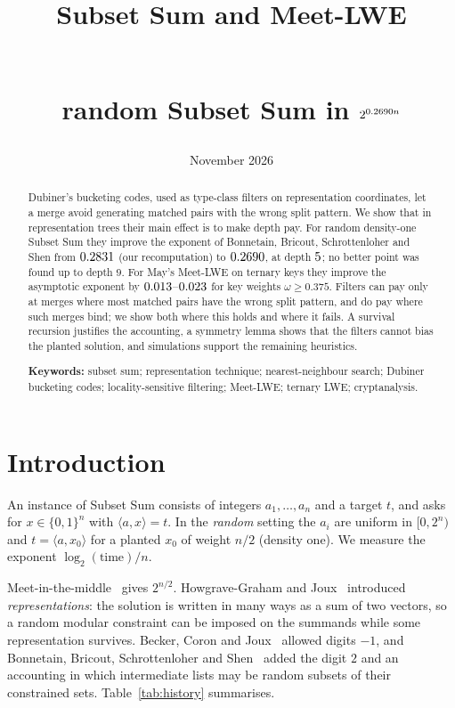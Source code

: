 \documentclass[11pt]{article}
\title{\titlehead:\\ Subset Sum and Meet-LWE}
\title{\titlehead:\\ random Subset Sum in \texorpdfstring{$2^{0.2690 n}$}{2\^{}(\Tbest n)}}
\date{November 2026}
\theoremstyle{definition}
\theoremstyle{remark}
\newif\ifincludemeetlwe \includemeetlwetrue  %
\begin{document}
\maketitle

\begin{abstract}
Dubiner's bucketing codes, used as type-class filters on representation coordinates, let a merge avoid generating
matched pairs with the wrong split pattern. We show that in representation trees their main effect is to make depth
pay. For random density-one Subset Sum they improve the exponent of Bonnetain, Bricout, Schrottenloher and Shen from
$0.2831$ (our recomputation) to $0.2690$, at depth $5$; no better point was found up to depth $9$.
\ifincludemeetlwe For May's Meet-LWE on ternary keys they improve the asymptotic exponent by $0.013$--$0.023$
for key weights $\omega\ge0.375$. \fi Filters can pay only at merges where most matched pairs have the wrong split
pattern, and do pay where such merges bind; we show both where this holds and where it fails. A survival recursion
justifies the accounting, a symmetry lemma shows that the filters cannot bias the planted solution, and simulations
support the remaining heuristics.

\medskip\noindent\textbf{Keywords:} subset sum; representation technique; nearest-neighbour search; Dubiner bucketing
codes; locality-sensitive filtering\ifincludemeetlwe; Meet-LWE; ternary LWE\fi; cryptanalysis.
\end{abstract}

\section{Introduction}
An instance of Subset Sum consists of integers $a_1,\dots,a_n$ and a target $t$, and asks for $x\in\{0,1\}^n$ with
$\langle a,x\rangle=t$. In the \emph{random} setting the $a_i$ are uniform in $[0,2^n)$ and $t=\langle a,x_0\rangle$
for a planted $x_0$ of weight $n/2$ (density one). We measure the exponent $\log_2(\text{time})/n$.

Meet-in-the-middle~\cite{HS74,SS81} gives $2^{n/2}$. Howgrave-Graham and Joux~\cite{HGJ10} introduced
\emph{representations}: the solution is written in many ways as a sum of two vectors, so a random modular constraint
can be imposed on the summands while some representation survives. Becker, Coron and Joux~\cite{BCJ11} allowed
digits $-1$, and Bonnetain, Bricout, Schrottenloher and Shen~\cite{BBSS20} added the digit $2$ and an accounting in
which intermediate lists may be random subsets of their constrained sets. Table~\ref{tab:history} summarises.
\end{document}

